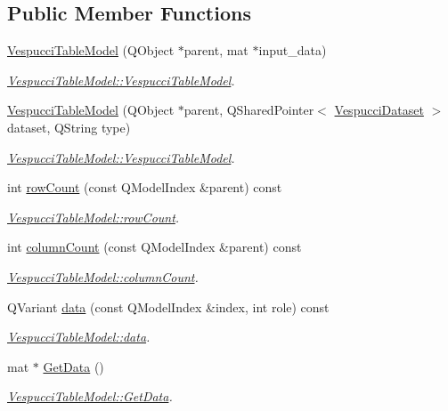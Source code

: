 \subsection*{Public Member Functions}
\begin{DoxyCompactItemize}
\item 
\hyperlink{class_vespucci_table_model_a5699dba13d0f4b29d047281f79bd018a}{Vespucci\+Table\+Model} (Q\+Object $\ast$parent, mat $\ast$input\+\_\+data)
\begin{DoxyCompactList}\small\item\em \hyperlink{class_vespucci_table_model_a5699dba13d0f4b29d047281f79bd018a}{Vespucci\+Table\+Model\+::\+Vespucci\+Table\+Model}. \end{DoxyCompactList}\item 
\hyperlink{class_vespucci_table_model_a76f4ecf714a2e586298402b5468b3a05}{Vespucci\+Table\+Model} (Q\+Object $\ast$parent, Q\+Shared\+Pointer$<$ \hyperlink{class_vespucci_dataset}{Vespucci\+Dataset} $>$ dataset, Q\+String type)
\begin{DoxyCompactList}\small\item\em \hyperlink{class_vespucci_table_model_a5699dba13d0f4b29d047281f79bd018a}{Vespucci\+Table\+Model\+::\+Vespucci\+Table\+Model}. \end{DoxyCompactList}\item 
int \hyperlink{class_vespucci_table_model_a0820ddde1a8538e106c68dc2893fad51}{row\+Count} (const Q\+Model\+Index \&parent) const 
\begin{DoxyCompactList}\small\item\em \hyperlink{class_vespucci_table_model_a0820ddde1a8538e106c68dc2893fad51}{Vespucci\+Table\+Model\+::row\+Count}. \end{DoxyCompactList}\item 
int \hyperlink{class_vespucci_table_model_a4759aecfe949a158a56020b283d0d8b5}{column\+Count} (const Q\+Model\+Index \&parent) const 
\begin{DoxyCompactList}\small\item\em \hyperlink{class_vespucci_table_model_a4759aecfe949a158a56020b283d0d8b5}{Vespucci\+Table\+Model\+::column\+Count}. \end{DoxyCompactList}\item 
Q\+Variant \hyperlink{class_vespucci_table_model_ac2ad0341ad7c307ddbcd3959af0df56e}{data} (const Q\+Model\+Index \&index, int role) const 
\begin{DoxyCompactList}\small\item\em \hyperlink{class_vespucci_table_model_ac2ad0341ad7c307ddbcd3959af0df56e}{Vespucci\+Table\+Model\+::data}. \end{DoxyCompactList}\item 
mat $\ast$ \hyperlink{class_vespucci_table_model_ac6ec4e91a07a79e30392d8e840865152}{Get\+Data} ()
\begin{DoxyCompactList}\small\item\em \hyperlink{class_vespucci_table_model_ac6ec4e91a07a79e30392d8e840865152}{Vespucci\+Table\+Model\+::\+Get\+Data}. \end{DoxyCompactList}\end{DoxyCompactItemize}


